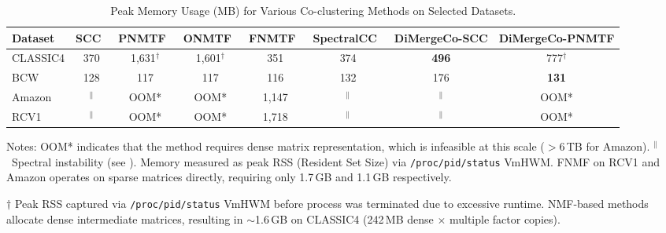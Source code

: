 \documentclass[journal]{IEEEtran}
\theoremstyle{definition}
\theoremstyle{remark} %
\renewcommand{\cite}[1]{~\autocite{#1}}
\begin{document}
{\color{blue}
\begin{table}[htbp]
    \centering
    \caption{Peak Memory Usage (MB) for Various Co-clustering Methods on Selected Datasets.}
    \label{tab:memory-usage}
    \begin{threeparttable}
        \begin{tabular}{@{} l ccccccc @{}}
            \toprule
            Dataset    & SCC\cite{dhillon2001CoclusteringDocumentsWords}
                       & PNMTF\cite{chen2023ParallelNonNegativeMatrix}
                       & ONMTF\cite{ding2006OrthogonalNonnegativeMatrix}
                       & FNMTF\cite{kim2011FastNonnegativeMatrix}
                       & SpectralCC\cite{sklearn2011}                     & \textbf{DiMergeCo-SCC} & \textbf{DiMergeCo-PNMTF} \\
            \midrule
            CLASSIC4   & 370             & 1,631$^\dagger$ & 1,601$^\dagger$ & 351            & 374              & \textbf{496}           & 777$^\dagger$            \\
            BCW        & 128             & 117             & 117             & 116            & 132              & 176                    & \textbf{131}             \\
            Amazon     & $^{\|}$         & OOM*            & OOM*            & 1,147          & $^{\|}$          & $^{\|}$                & OOM*                     \\
            RCV1       & $^{\|}$         & OOM*            & OOM*            & 1,718          & $^{\|}$          & $^{\|}$                & OOM*                     \\
            \bottomrule
        \end{tabular}
        \begin{tablenotes}
            \small
            \item Notes: OOM* indicates that the method requires dense matrix representation, which is infeasible at this scale ($>$6\,TB for Amazon). $^{\|}$~Spectral instability (see ).
            Memory measured as peak RSS (Resident Set Size) via \texttt{/proc/pid/status} VmHWM. FNMF on RCV1 and Amazon operates on sparse matrices directly, requiring only 1.7\,GB and 1.1\,GB respectively.
            \item[$\dagger$] Peak RSS captured via \texttt{/proc/pid/status} VmHWM before process was terminated due to excessive runtime. NMF-based methods allocate dense intermediate matrices, resulting in $\sim$1.6\,GB on CLASSIC4 (242\,MB dense $\times$ multiple factor copies).
        \end{tablenotes}
    \end{threeparttable}
\end{table}
}
\end{document}
